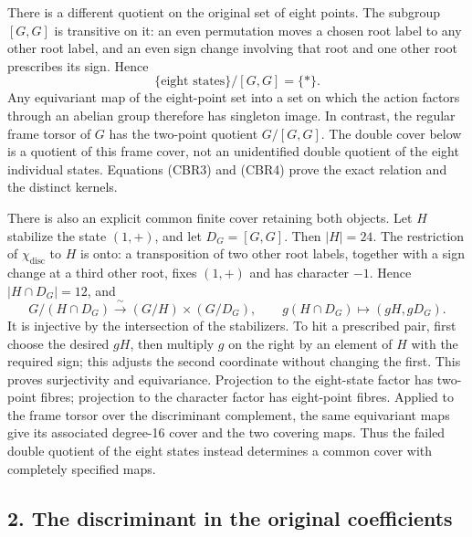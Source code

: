 \documentclass[
  10pt,
  a4paper,
]{article}
\begin{document}
There is a different quotient on the original set of eight points. The
subgroup \([G,G]\) is transitive on it: an even permutation moves a
chosen root label to any other root label, and an even sign change
involving that root and one other root prescribes its sign. Hence \[
\{\text{eight states}\}/[G,G]=\{*\}.
\tag{CBR4}
\] Any equivariant map of the eight-point set into a set on which the
action factors through an abelian group therefore has singleton image.
In contrast, the regular frame torsor of \(G\) has the two-point
quotient \(G/[G,G]\). The double cover below is a quotient of this frame
cover, not an unidentified double quotient of the eight individual
states. Equations (CBR3) and (CBR4) prove the exact relation and the
distinct kernels.

There is also an explicit common finite cover retaining both objects.
Let \(H\) stabilize the state \((1,+)\), and let \(D_G=[G,G]\). Then
\(|H|=24\). The restriction of \(\chi_{\mathrm{disc}}\) to \(H\) is
onto: a transposition of two other root labels, together with a sign
change at a third other root, fixes \((1,+)\) and has character \(-1\).
Hence \(|H\cap D_G|=12\), and \[
G/(H\cap D_G)\xrightarrow{\ \sim\ }
(G/H)\times(G/D_G),\qquad
g(H\cap D_G)\longmapsto(gH,gD_G).
\tag{CBR4a}
\] It is injective by the intersection of the stabilizers. To hit a
prescribed pair, first choose the desired \(gH\), then multiply \(g\) on
the right by an element of \(H\) with the required sign; this adjusts
the second coordinate without changing the first. This proves
surjectivity and equivariance. Projection to the eight-state factor has
two-point fibres; projection to the character factor has eight-point
fibres. Applied to the frame torsor over the discriminant complement,
the same equivariant maps give its associated degree-16 cover and the
two covering maps. Thus the failed double quotient of the eight states
instead determines a common cover with completely specified maps.

\subsection{2. The discriminant in the original
coefficients}\label{the-discriminant-in-the-original-coefficients}
\end{document}
